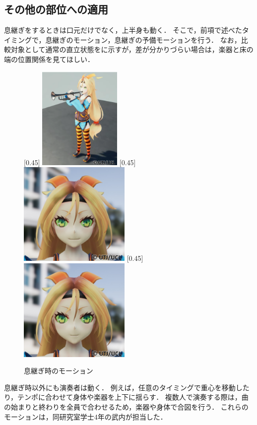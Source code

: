 \subsection{その他の部位への適用}
\indent
息継ぎをするときは口元だけでなく，上半身も動く．
そこで，前項で述べたタイミングで，息継ぎのモーション，息継ぎの予備モーションを行う．
なお，比較対象として通常の直立状態をに示すが，差が分かりづらい場合は，楽器と床の端の位置関係を見てほしい．\\
\begin{figure}[t]
	\centering
	[0.45\linewidth]{
		\includegraphics[height=5cm]{fig/chap3/default.eps}}
	[0.45\linewidth]{
		\includegraphics[height=5cm]{fig/chap3/high.eps}}
	[0.45\linewidth]{
		\includegraphics[height=5cm]{fig/chap3/low.eps}}
	\caption{息継ぎ時のモーション}
	\label{fig:breath}
\end{figure}
\indent
息継ぎ時以外にも演奏者は動く．
例えば，任意のタイミングで重心を移動したり，テンポに合わせて身体や楽器を上下に揺らす．
複数人で演奏する際は，曲の始まりと終わりを全員で合わせるため，楽器や身体で合図を行う．
これらのモーションは，同研究室学士4年の武内が担当した．

